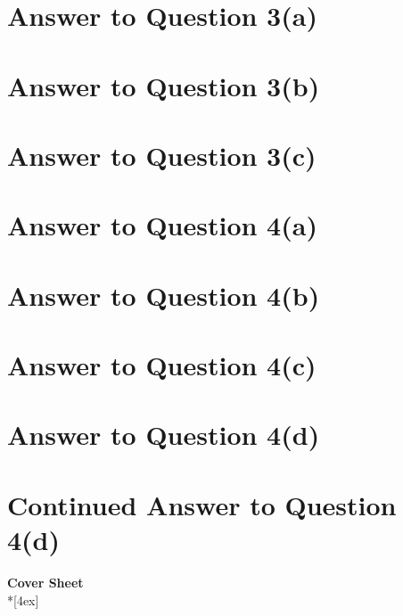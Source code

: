 \documentclass[11pt]{article}
\begin{document}
\pagebreak[4]
\section*{Answer to Question 3(a)}

\pagebreak[4]
\section*{Answer to Question 3(b)}

\pagebreak[4]
\section*{Answer to Question 3(c)}

\pagebreak[4]
\section*{Answer to Question 4(a)}

\pagebreak[4]
\section*{Answer to Question 4(b)}

\pagebreak[4]
\section*{Answer to Question 4(c)}

\pagebreak[4]
\section*{Answer to Question 4(d)}

\pagebreak[4]
\section*{Continued Answer to Question 4(d)}

\pagebreak[4]
\begin{center}
\LARGE{\bf \textsf{Cover Sheet}} \\*[4ex]
\end{center}
\end{document}
